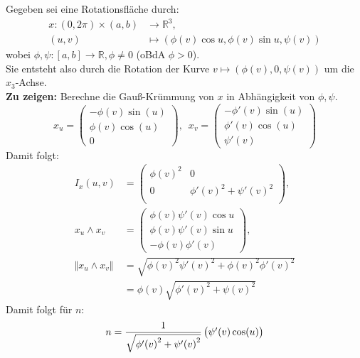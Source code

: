 \begin{problem}[2a]
  Gegeben sei eine Rotationsfläche durch:
  \begin{align*}
    x:(0,2\pi) \times (a,b) &\to \mathbb{R}^3, \\
    (u,v) &\mapsto (\phi(v)\cos u, \phi(v)\sin u, \psi(v))
  \end{align*}
  wobei \( \phi, \psi: [a,b] \to \mathbb{R}, \phi \neq 0 \) (oBdA \( \phi > 0 \)). \\ 
  Sie entsteht also durch die Rotation der Kurve \( v \mapsto (\phi(v), 0, \psi(v)) \) um die \( x_3 \)-Achse. \\
  \textbf{Zu zeigen:} Berechne die Gauß-Krümmung von \( x \) in Abhängigkeit von \( \phi, \psi \).
  \begin{equation*}
    x_u = \begin{pmatrix}
      -\phi(v)\sin(u) \\ \phi(v)\cos(u) \\ 0	
    \end{pmatrix}, \enspace
    x_v = \begin{pmatrix}
      -\phi'(v)\sin(u) \\ \phi'(v)\cos(u) \\ \psi'(v)	
    \end{pmatrix} 
  \end{equation*}
  Damit folgt: 
  \begin{align*}
    I_x(u,v) &= 
    \begin{pmatrix}
      {\phi(v)}^2 & 0 \\
      0 & {\phi'(v)}^2 + {\psi'(v)}^2 \\
    \end{pmatrix}, \\
    x_u \land x_v &= 
    \begin{pmatrix}
      \phi(v) \psi'(v) \cos u \\
      \phi(v) \psi'(v) \sin u \\
      -\phi(v) \phi'(v)
    \end{pmatrix}, \\
    \Vert x_u \land x_v \Vert &= \sqrt{ {\phi(v)}^2 {\psi'(v)}^2 + {\phi(v)}^2 {\phi'(v)}^2} \\
    &= \phi(v) \sqrt{ {\phi'(v)}^2 + {\psi(v)}^2}
  \end{align*}
  Damit folgt für \( n \):
  \begin{equation*}
    \centering
    n = \frac{1}{\sqrt{ {\phi'(v)}^2 + {\psi'(v)}^2}} \begin{pmatrix}
      \psi'(v) \cos(u) \\

\end{pmatrix}
\end{equation*}
\end{problem}
